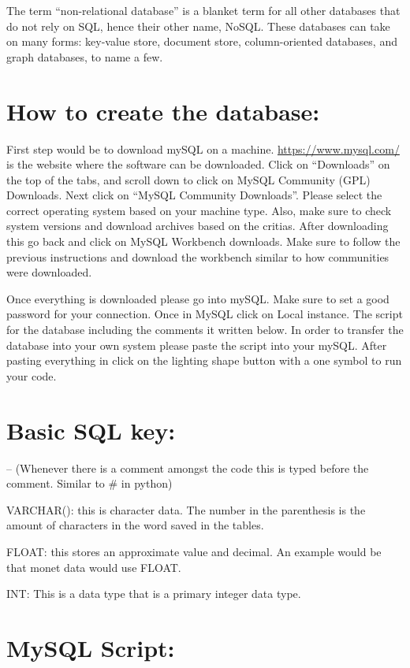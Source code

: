 \documentclass[]{book}
\begin{document}
The term ``non-relational database'' is a blanket term for all other
databases that do not rely on SQL, hence their other name, NoSQL. These
databases can take on many forms: key-value store, document store,
column-oriented databases, and graph databases, to name a few.

\section{How to create the database:}\label{how-to-create-the-database}

First step would be to download mySQL on a machine.
\url{https://www.mysql.com/} is the website where the software can be
downloaded. Click on ``Downloads'' on the top of the tabs, and scroll
down to click on MySQL Community (GPL) Downloads. Next click on ``MySQL
Community Downloads''. Please select the correct operating system based
on your machine type. Also, make sure to check system versions and
download archives based on the critias. After downloading this go back
and click on MySQL Workbench downloads. Make sure to follow the previous
instructions and download the workbench similar to how communities were
downloaded.

Once everything is downloaded please go into mySQL. Make sure to set a
good password for your connection. Once in MySQL click on Local
instance. The script for the database including the comments it written
below. In order to transfer the database into your own system please
paste the script into your mySQL. After pasting everything in click on
the lighting shape button with a one symbol to run your code.

\section{Basic SQL key:}\label{basic-sql-key}

-- (Whenever there is a comment amongst the code this is typed before
the comment. Similar to \# in python)

VARCHAR(): this is character data. The number in the parenthesis is the
amount of characters in the word saved in the tables.

FLOAT: this stores an approximate value and decimal. An example would be
that monet data would use FLOAT.

INT: This is a data type that is a primary integer data type.

\section{MySQL Script:}\label{mysql-script}
\end{document}
